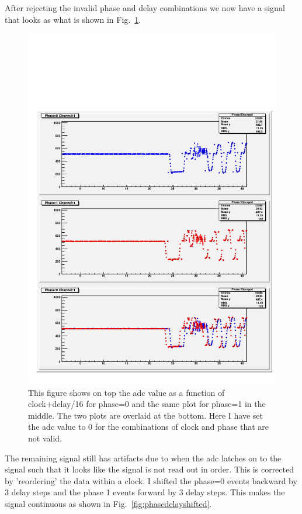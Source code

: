 After rejecting the invalid phase and delay combinations we now have a signal that looks as what is shown in Fig.~\ref{fig:phasedelayvalid}.

\begin{figure}
\begin{center}
\includegraphics[width=\linewidth]{phaseAndDelayPlotPurged_channe_1_1}
\end{center}
\caption{This figure shows on top the adc value as a function of clock+delay/16 for phase=0 and the same plot for phase=1 in the middle. The two plots are overlaid at the bottom. Here I have set the adc value to 0 for the combinations of clock and phase that are not valid.}
\label{fig:phasedelayvalid}
\end{figure}

The remaining signal still has artifacts due to when the adc latches on to the signal such that it looks like the signal is not read out in order. This is corrected by 'reordering' the data within a clock. I shifted the phase=0 events backward by 3 delay steps and the phase 1 events forward by 3 delay steps. This makes the signal continuous as shown in Fig.~\ref{fig:phasedelayshifted}.

